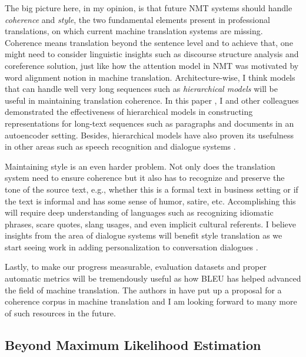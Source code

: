 The big picture here, in my opinion, is that future NMT systems should handle {\it coherence} and {\it style}, the two fundamental elements present in professional translations, on which current machine translation systems are missing. Coherence means translation beyond the sentence level and to achieve that, one might need to consider linguistic insights such as discourse structure analysis and coreference solution, just like how the attention model in NMT was motivated by word alignment notion in machine translation. 
Architecture-wise, I think models that can handle well very long sequences such as {\it hierarchical models} will be useful in maintaining translation coherence. In this paper \cite{li15}, I and other colleagues demonstrated the effectiveness of hierarchical models in constructing representations for long-text sequences such as paragraphs and documents in an autoencoder setting.
Besides, hierarchical models have also proven its usefulness in other areas such as speech recognition \cite{chan16} and dialogue systems \cite{serban16}.

Maintaining style is an even harder problem. Not only does the translation system need to ensure coherence but it also has to recognize and preserve the tone of the source text, e.g., whether this is a formal text in business setting or if the text is informal and has some sense of humor, satire, etc. Accomplishing this will require deep understanding of languages such as recognizing idiomatic phrases, scare quotes, slang usages, and even implicit cultural referents. I believe insights from the area of dialogue systems will benefit style translation as we start seeing work in adding personalization to conversation dialogues \cite{li16,alrfou16}.


Lastly, to make our progress measurable, evaluation datasets and proper automatic metrics will be tremendously useful as how BLEU \cite{Papineni02bleu} has helped advanced the field of machine translation. The authors in \cite{smith15} have put up a proposal for a coherence corpus in machine translation and I am looking forward to many more of such resources in the future.




\subsection{Beyond Maximum Likelihood Estimation}
\cite{xia16,tu16}
